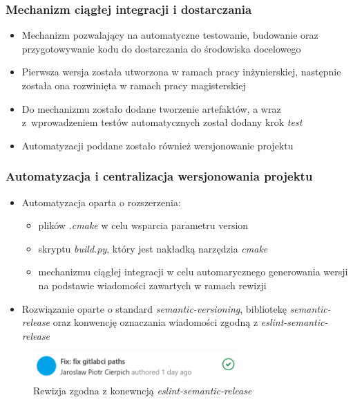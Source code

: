 \documentclass[10pt]{beamer}
\begin{document}
\begin{frame}
\frametitle{Mechanizm ciągłej integracji i dostarczania}
    \begin{itemize}
        \item Mechanizm pozwalający na automatyczne testowanie, budowanie oraz przygotowywanie kodu do dostarczania do środowiska docelowego
        \item Pierwsza wersja została utworzona w ramach pracy inżynierskiej, następnie została ona rozwinięta w ramach pracy magisterskiej
        \item Do mechanizmu zostało dodane tworzenie artefaktów, a wraz z~wprowadzeniem testów automatycznych został dodany krok \emph{test}
        \item Automatyzacji poddane zostało również wersjonowanie projektu
    \end{itemize}
\end{frame}

\begin{frame}
\frametitle{Automatyzacja i centralizacja wersjonowania projektu}
    \begin{itemize}
        \item Automatyzacja oparta o rozszerzenia:
            \begin{itemize}
                \item plików \emph{.cmake} w celu wsparcia parametru version
                \item skryptu \emph{build.py}, który jest nakładką narzędzia \emph{cmake}
                \item mechanizmu ciągłej integracji w celu automarycznego generowania wersji na podstawie wiadomości zawartych w ramach rewizji
            \end{itemize}
        \item Rozwiązanie oparte o standard \emph{semantic-versioning}, bibliotekę \emph{semantic-release} oraz konwencję oznaczania wiadomości zgodną z \emph{eslint-semantic-release}
    \end{itemize}
\begin{figure}
    \includegraphics[width=0.7\textwidth]{static/commit}
    \caption{Rewizja zgodna z konewncją \emph{eslint-semantic-release}}
\end{figure}
\end{frame}
\end{document}
